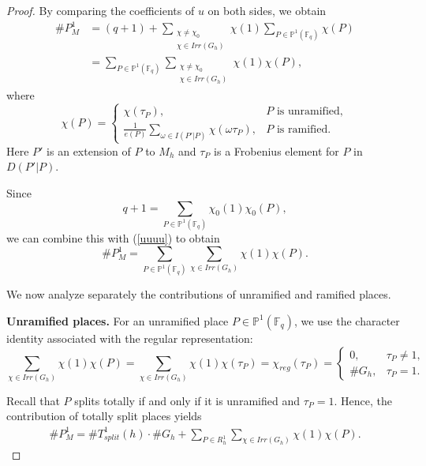 \documentclass[1p,final]{elsarticle}
\newtheorem{open problem}[theorem]{Open Problem}
\begin{document}
\begin{proof}
By comparing the coefficients of $u$ on both sides, we obtain
\begin{equation}\label{uuuu}
\begin{aligned}
\#P_M^1
&=(q+1)+\sum_{\substack{\chi\ne \chi_{0} \\ \chi\in Irr(G_{h})}}\chi(1) \sum_{P \in  \mathbb{P}^{1}(\mathbb{F}_{q}) } \chi(P)\\
&=\sum_{P \in \mathbb{P}^{1}(\mathbb{F}_{q})}\sum_{\substack{\chi\ne \chi_{0} \\ \chi\in Irr(G_{h})}}  \chi(1)\chi(P),
\end{aligned}
\end{equation}
where
\begin{equation}
\chi(P)=\left\{
\begin{array}{cl}
\chi(\tau_P), &  P \text{ is unramified}, \\
\displaystyle\frac{1}{e(P)}\sum_{\omega \in I(P'|P)} \chi(\omega \tau_P), &  P \text{ is ramified}.
\end{array} \right.
\end{equation}
Here $P'$ is an extension of $P$ to $M_{h}$ and $\tau_P$ is a Frobenius element for $P$ in $D(P'|P)$.

\medskip

Since 
\[
q+1=\sum_{P \in \mathbb{P}^{1}(\mathbb{F}_{q})}\chi_0(1)\chi_0(P),
\]
we can combine this with (\ref{uuuu}) to obtain
\begin{equation}
\# P_M^1= \sum_{P \in  \mathbb{P}^{1}(\mathbb{F}_{q}) } \sum_{\chi\in Irr(G_{h})}\chi(1)\chi(P).
\end{equation}

\medskip

We now analyze separately the contributions of unramified and ramified places.

\medskip

\noindent
\textbf{Unramified places.}
For an unramified place $P \in  \mathbb{P}^{1}(\mathbb{F}_{q})$, we use the character identity associated with the regular representation:
\begin{equation}
\sum_{\chi\in Irr(G_{h}) }\chi(1)\chi(P)
=
\sum_{\chi\in Irr(G_{h}) }\chi(1)\chi(\tau_P)
=
\chi_{reg}(\tau_P)
=
\left\{
\begin{array}{cl}
0, &  \tau_P \neq 1,  \\
\#G_{h}, & \tau_P = 1.
\end{array}
\right.
\end{equation}

Recall that $P$ splits totally if and only if it is unramified and $\tau_P = 1$. Hence, the contribution of totally split places yields
\begin{equation}\label{half}
\begin{aligned}
\#P_M^1
=
\#T^1_{split}(h)\cdot \#G_{h}
+
\sum_{P\in R_{h}^{1}} \sum_{\chi\in Irr(G_{h})} \chi (1) \chi(P).
\end{aligned}
\end{equation}


\end{proof}
\end{document}
